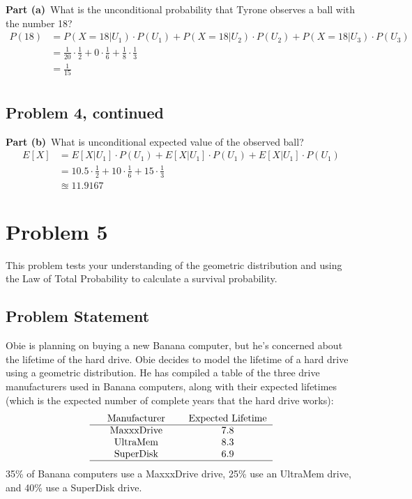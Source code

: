 \documentclass[12pt]{article}
\theoremstyle{definition}
\begin{document}
\noindent
{\bf Part (a)}\ What is the unconditional probability that Tyrone observes a ball with the number 18?
\begin{align*}
P(18) &= P(X=18|U_1)\cdot P(U_1) + P(X=18|U_2)\cdot P(U_2) + P(X=18|U_3)\cdot P(U_3)\\
&= \frac{1}{20}\cdot \frac{1}{2} + 0\cdot \frac{1}{6} + \frac{1}{8}\cdot \frac{1}{3}\\
&= \frac{1}{15}\\
\end{align*}




\newpage
\subsection*{Problem 4, continued}

\vspace{2in}
\noindent
{\bf Part (b)}\ What is unconditional expected value of the observed ball?
\begin{align*}
E[X] & = E[X|U_1]\cdot P(U_1) + E[X|U_1]\cdot P(U_1) + E[X|U_1]\cdot P(U_1)\\
&= 10.5\cdot \frac{1}{2} + 10\cdot \frac{1}{6} + 15\cdot \frac{1}{3}\\
&\approxeq 11.9167
\end{align*}




\newpage
\section*{Problem 5}

This problem tests your understanding of the geometric distribution and using the Law of Total Probability to calculate a survival probability.

\subsection*{Problem Statement}

Obie is planning on buying a new Banana computer, but he's concerned about the lifetime of the hard drive. Obie decides to model the lifetime of a hard drive using a geometric distribution. He has compiled a table of the three drive manufacturers used in Banana computers, along with their expected lifetimes (which is the expected number of complete years that the hard drive works):
$$
\begin{tabular}{ccccc}
& Manufacturer & & Expected Lifetime\\
\hline
& MaxxxDrive & & 7.8\\
& UltraMem & & 8.3\\
& SuperDisk & & 6.9\\
\hline
\end{tabular}
$$
35\% of Banana computers use a MaxxxDrive drive, 25\% use an UltraMem drive, and 40\% use a SuperDisk drive.
\end{document}
